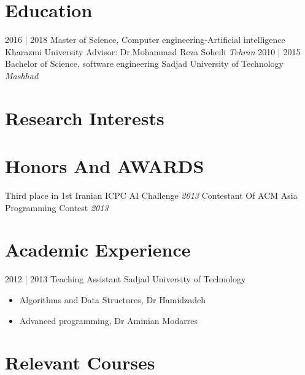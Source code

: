 \documentclass[letterpaper]{moderncv}        %
\begin{document}
\makecvtitle
    

\section{Education}

\cventry
{2016 | 2018}
{Master of Science, Computer engineering-Artificial intelligence}
{Kharazmi University}
{Advisor: Dr.Mohammad Reza Soheili}
{\textit{Tehran}}
{}
\cventry
{2010 | 2015}
{Bachelor of Science, software engineering}
{Sadjad University of Technology}
{}
{\textit{Mashhad}}
{}
\section{Research Interests}


\section{Honors And AWARDS}
\cventry
{}
{Third place in 1st Iranian ICPC AI Challenge}
{}
{\textit{2013}}
{}
{}
\vspace{1mm}
\cventry
{}
{Contestant Of ACM Asia Programming Contest}
{}
{\textit{2013}}
{}
{}
\vspace{1mm}

\section{Academic Experience}
\cventry
{2012 | 2013}
{Teaching Assistant}
{Sadjad University of Technology}
{}
{}
{\begin{itemize}%
	\item Algorithms and Data Structures, Dr Hamidzadeh
	\item Advanced programming, Dr Aminian Modarres 
	\end{itemize}}
	
\section{Relevant Courses}

\end{document}
